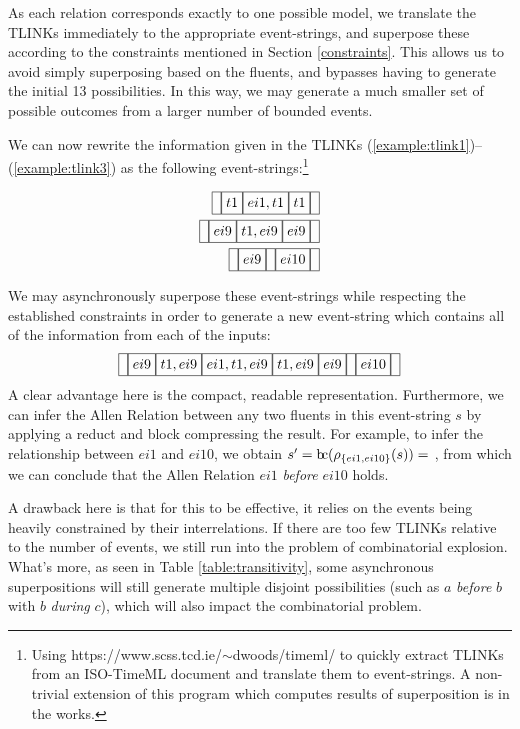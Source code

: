 \documentclass[a4paper,11pt,leqno]{article}
\newcommand{\bc}{{\rm b\!c}}
\newcommand{\vph}[1]{\vphantom{#1}}
\newcommand{\ebox}[1]{\fbox{$\vph{',}#1$}}
\begin{document}
As each relation corresponds exactly to one possible model, we translate the 
TLINKs immediately to the appropriate event-strings, and superpose these 
according to the constraints mentioned in Section \ref{constraints}. This 
allows us to avoid simply superposing based on the fluents, and bypasses having 
to generate the initial 13 possibilities. In this way, we may generate a much 
smaller set of possible outcomes from a larger number of bounded events.

We can now rewrite the information given in the TLINKs 
(\ref{example:tlink1})--(\ref{example:tlink3}) as the following 
event-strings:\footnote{Using https://www.scss.tcd.ie/$\sim$dwoods/timeml/ to 
quickly extract TLINKs from an ISO-TimeML document and translate them to 
event-strings. A non-trivial extension of this program which computes results 
of superposition is in the works.}

\begin{subequations}
\begin{align}
\ebox{}\ebox{t1}\ebox{ei1,t1}\ebox{t1}\ebox{}\\
\ebox{}\ebox{ei9}\ebox{t1,ei9}\ebox{ei9}\ebox{}\\
\ebox{}\ebox{ei9}\ebox{}\ebox{ei10}\ebox{}
\end{align}
\end{subequations}

We may asynchronously superpose these event-strings while respecting the 
established constraints in order to generate a new event-string which contains 
all of the information from each of the inputs:
\begin{align}
\ebox{}\ebox{ei9}\ebox{t1,ei9}\ebox{ei1,t1,ei9}\ebox{t1,ei9}\ebox{ei9}\ebox{}\ebox{ei10}\ebox{}
\end{align}
A clear advantage here is the compact, readable representation. Furthermore, we 
can infer the Allen Relation between any two fluents in this event-string $s$ 
by applying a reduct and block compressing the result. For example, to infer the
relationship between $ei1$ and $ei10$, we obtain $s' = 
\bc{}(\rho_{\{ei1,ei10\}}(s)) = $ \ebox{}\ebox{ei1}\ebox{}\ebox{ei10}\ebox{}, 
from which we can conclude that the Allen Relation $ei1$ \textit{before} $ei10$ 
holds.

A drawback here is that for this to be effective, it relies on the events being 
heavily constrained by their interrelations. If there are too few TLINKs 
relative to the number of events, we still run into the problem of 
combinatorial explosion. What's more, as seen in Table 
\ref{table:transitivity}, some asynchronous superpositions will still generate 
multiple disjoint possibilities (such as $a$ \textit{before} $b$ with $b$ 
\textit{during} $c$), which will also impact the combinatorial problem.
\end{document}
